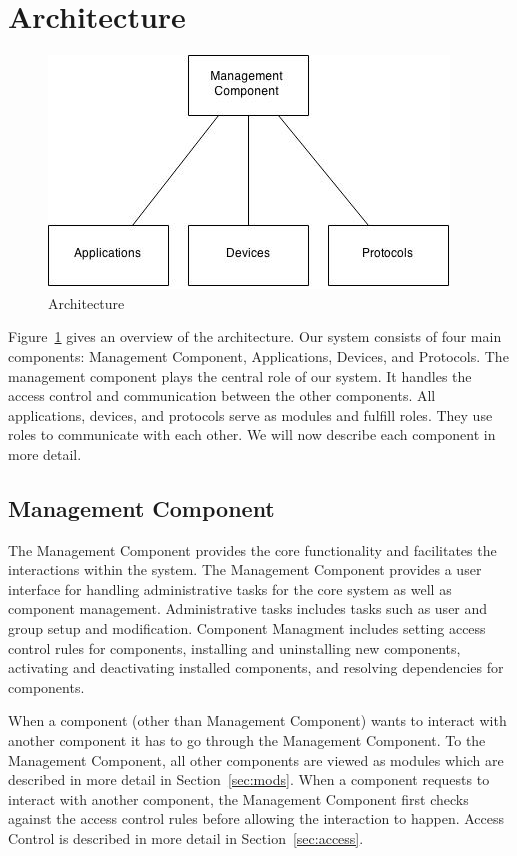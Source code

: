 \section{Architecture}
\label{sec:arch}
\begin{figure}[tbh]
    \centering
    \includegraphics[width=1.0\columnwidth]{figs/homeOSArch.jpg}
    \caption{Architecture}
    \label{Fig:Arch}
\end{figure}
Figure~\ref{Fig:Arch} gives an overview of the architecture. Our system
consists of four main components: Management Component, Applications,
Devices, and Protocols. The management component plays the central role of our
system. It handles the access control and communication between the other
components. All applications, devices, and protocols serve as modules and
fulfill roles. They use roles to communicate with each other. We will now
describe each component in more detail.
\subsection{Management Component}
\label{sec:mgmt}
The Management Component provides the core functionality and facilitates the
interactions within the system. The Management Component provides a user
interface for handling administrative tasks for the core system as well as
component management. Administrative tasks includes tasks such as user and
group setup and modification. Component Managment includes setting access
control rules for components, installing and uninstalling new components,
activating and deactivating installed components, and resolving dependencies
for components. 

When a component (other than Management Component) wants to interact with
another component it has to go through the Management Component. To the
Management Component, all other components are viewed as modules which are
described in more detail in Section~\ref{sec:mods}. When a component requests
to interact with another component, the Management Component first checks
against the access control rules before allowing the interaction to happen.
Access Control is described in more detail in Section~\ref{sec:access}.
